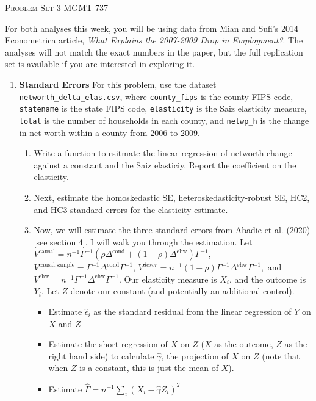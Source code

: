 \documentclass[11pt, a4paper]{article}
\begin{document}
\begin{center}
  {\Large \textsc{Problem Set 3}}
  MGMT 737
\end{center}

For both analyses this week, you will be using data from Mian and
Sufi's 2014 Econometrica article, \textit{What Explains the 2007-2009
  Drop in Employment?}. The analyses will not match the exact
numbers in the paper, but the full replication set is available if you are interested in exploring it.

\begin{enumerate}
\item \textbf{Standard Errors} For this problem, use the dataset \texttt{networth\_delta\_elas.csv}, where \texttt{county\_fips} is the county FIPS code, \texttt{statename} is the state FIPS code, \texttt{elasticity} is the Saiz elasticity measure, \texttt{total} is the number of households in each county, and \texttt{netwp\_h} is the change in net worth within a county from 2006 to 2009.
  \begin{enumerate}
  \item Write a function to esitmate the linear regression of networth change against a constant and the Saiz elasticiy. Report the coefficient on the elasticity. 
  \item Next, estimate the homoskedastic SE, heteroskedasticity-robust SE, HC2, and HC3 standard errors for the elasticity estimate.
  \item Now, we will estimate the three standard errors from Abadie et al. (2020) [see section 4]. I will walk you through the estimation. Let $V^{\text{causal}} = n^{-1}\Gamma^{-1}(\rho\Delta^{\text{cond}} + (1-\rho)\Delta^{\text{ehw}})\Gamma^{-1}$, $V^{\text{causal,sample}} = \Gamma^{-1}\Delta^{\text{cond}}\Gamma^{-1}$, $V^{descr} = n^{-1}(1-\rho)\Gamma^{-1}\Delta^{\text{ehw}}\Gamma^{-1},$ and $V^{\text{ehw}} = n^{-1}\Gamma^{-1}\Delta^{\text{ehw}}\Gamma^{-1}.$ Our elasticity measure is $X_{i}$, and the outcome is $Y_{i}$. Let $Z$ denote our constant (and potentially an additional control).
    \begin{itemize}
    \item Estimate $\hat{\epsilon}_{i}$ as the standard residual from
      the linear regression of $Y$ on $X$ and $Z$
    \item Estimate the short regression of $X$ on $Z$ ($X$ as the outcome, $Z$ as the right hand side)  to calculate $\hat{\gamma}$, the projection of $X$ on $Z$ (note that when $Z$ is a constant, this is just the mean of $X$).
    \item Estimate $\hat{\Gamma} = n^{-1}\sum_{i}(X_{i} - \hat{\gamma}Z_{i})^{2}$

\end{itemize}
\end{enumerate}
\end{enumerate}
\end{document}
